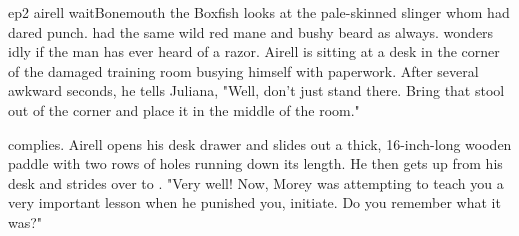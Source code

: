 \documentclass{book}
\begin{document}
\begin{childnode}{ep2 airell wait}{Bonemouth the Boxfish}
    \name{} looks at the pale-skinned slinger whom \heshe{} had dared punch. \HeShe{} had the same wild red mane and bushy beard as always. \name{} wonders idly if the man has ever heard of a razor. 
    Airell is sitting at a desk in the corner of the damaged training room busying himself with paperwork. After several awkward seconds, he tells Juliana, "Well, don't just stand there. Bring that 
    stool out of the corner and place it in the middle of the room."

    \name{} complies. Airell opens his desk drawer and slides out a thick, 16-inch-long wooden paddle with two rows of holes running down its length. He then gets up from his desk and strides over 
    to \name{}. "Very well! Now, Morey was attempting to teach you a very important lesson when he punished you, initiate. Do you remember what it was?"


\end{childnode}
\end{document}
